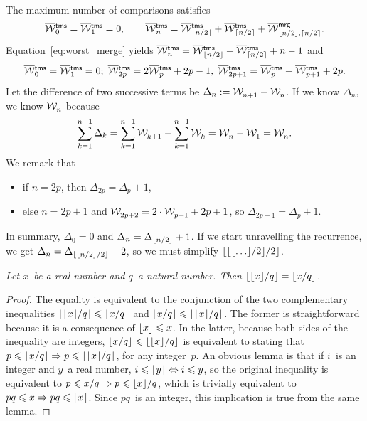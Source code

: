 The maximum number of comparisons satisfies
\begin{equation*}
\OW{\fun{tms}}{0} = \OW{\fun{tms}}{1} = 0,
\qquad
\OW{\fun{tms}}{n} = \OW{\fun{tms}}{\floor{n/2}}
+ \OW{\fun{tms}}{\ceiling{n/2}}
+ \OW{\fun{mrg}}{\floor{n/2},\ceiling{n/2}}.
\index{tms@$\OW{\fun{tms}}{n}$|(}
\index{mrg@\fun{mrg/2}}
\end{equation*}
Equation~\eqref{eq:worst_merge}  yields
\(\OW{\fun{tms}}{n} = \OW{\fun{tms}}{\floor{n/2}} +
\OW{\fun{tms}}{\ceiling{n/2}} + n - 1\) and
\begin{equation*}
\OW{\fun{tms}}{0} = \OW{\fun{tms}}{1} = 0;\;
\OW{\fun{tms}}{2p} = 2\OW{\fun{tms}}{p} + 2p - 1,\;
\OW{\fun{tms}}{2p+1} = \OW{\fun{tms}}{p} + \OW{\fun{tms}}{p+1} + 2p.
\end{equation*}
Let the difference of two successive terms be \(\Delta_n :=
\smash[t]{\mathcal{W}_{n+1}^{}} - \mathcal{W}_{n}^{}\). If we know \(\Delta_n\), we know
\(\mathcal{W}_{n}^{}\) because
\begin{equation*}
  \sum_{k=1}^{n-1}\Delta_k =
\sum_{k=1}^{n-1}\mathcal{W}_{k+1}^{} - \sum_{k=1}^{n-1}\mathcal{W}_{k}^{} = \mathcal{W}_{n}^{} -
\mathcal{W}_{1}^{} = \mathcal{W}_{n}^{}.
\end{equation*}
We remark that
\begin{itemize}

  \item if \(n=2p\), then \(\Delta_{2p} = \Delta_{p} + 1\),

  \item else \(n=2p+1\) and \(\mathcal{W}_{2p+2}^{} = 2 \cdot \mathcal{W}_{p+1}^{} + 2p
    + 1\), so \(\Delta_{2p+1} = \Delta_{p} + 1\).

\end{itemize}
In summary, \(\Delta_0 = 0\) and \(\Delta_n = \Delta_{\lfloor{n/2}\rfloor} +
1\). If we start unravelling the recurrence, we get \(\Delta_n =
\Delta_{\lfloor{\lfloor{n/2}\rfloor/2}\rfloor}+ 2\), so we must simplify
\(\lfloor{\lfloor{\lfloor{\dots}\rfloor/2}\rfloor/2}\rfloor\).
\begin{thm}
\label{thm:floors}
\textsl{Let \(x\)~be a real number and \(q\)~a natural number. Then
  \(\lfloor{\lfloor{x}\rfloor/q}\rfloor = \lfloor{x/q}\rfloor\).}
\end{thm}
\begin{proof}
  The equality is equivalent to the conjunction of the two
  complementary inequalities \(\lfloor{\lfloor{x}\rfloor/q}\rfloor \leqslant
  \lfloor{x/q}\rfloor\) and \(\lfloor{x/q}\rfloor \leqslant \lfloor{\lfloor{x}\rfloor/q}\rfloor\). The
  former is straightforward because it is a consequence of \(\lfloor{x}\rfloor
  \leqslant x\). In the latter, because both sides of the inequality
  are integers, \(\lfloor{x/q}\rfloor \leqslant \lfloor{\lfloor{x}\rfloor/q}\rfloor\) is
  equivalent to stating that \(p \leqslant \lfloor{x/q}\rfloor \Rightarrow p
  \leqslant \lfloor{\lfloor{x}\rfloor/q}\rfloor\), for any integer~\(p\). An obvious
  lemma is that if \(i\)~is an integer and \(y\)~a real number, \(i
  \leqslant \lfloor{y}\rfloor \Leftrightarrow i \leqslant y\), so the original
  inequality is equivalent to \(p \leqslant x/q \Rightarrow p
  \leqslant \lfloor{x}\rfloor/q\), which is trivially equivalent to \(pq
  \leqslant x \Rightarrow pq \leqslant \lfloor{x}\rfloor\). Since \(pq\)~is an
  integer, this implication is true from the same lemma.
\end{proof}
